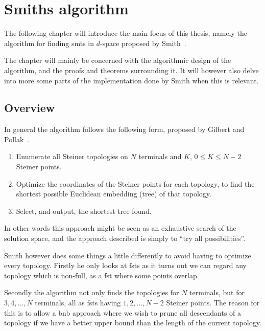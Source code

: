 {
\abnormalparskip{0pt}
\chapter{Smiths algorithm}
\label{cha:algorithm}
}


The following chapter will introduce the main focus of this thesis, namely the
algorithm for finding \glspl{smt} in $d$-space proposed by
Smith~\cite{Smith1992}.

The chapter will mainly be concerned with the algorithmic design of the
algorithm, and the proofs and theorems surrounding it. It will however also
delve into more some parts of the implementation done by Smith when this is
relevant.

\section{Overview}
\label{sec:overview}

In general the algorithm follows the following form, proposed by Gilbert and
Pollak~\cite{Gilbert1968}.

\begin{enumerate}
\item Enumerate all Steiner topologies on $N$ terminals and $K$, $0 \le K
  \le N-2$ Steiner points.
\item Optimize the coordinates of the Steiner points for each topology, to find
  the shortest possible Euclidean embedding (tree) of that topology.
\item Select, and output, the shortest tree found.
\end{enumerate}

In other words this approach might be seen as an exhaustive search of the
solution space, and the approach described is simply to ``try all
possibilities''.

Smith however does some things a little differently to avoid having to optimize
every topology. Firstly he only looks at \glspl{fst} as it turns out we can
regard any topology which is non-full, as a \gls{fst} where some points overlap.

Secondly the algorithm not only finds the topologies for $N$ terminals, but
for $3, 4, \ldots, N$ terminals, all as \glspl{fst} having
$1, 2, \ldots, N-2$ Steiner points. The reason for this is to allow a \gls{bnb}
approach where we wish to prune all descendants of a topology if we have a
better upper bound than the length of the current topology.


